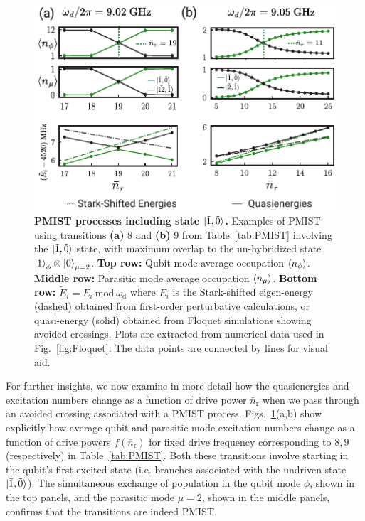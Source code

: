 \documentclass[%
reprint,
superscriptaddress,
 amsmath,amssymb,
 aps,
 prx,
longbibliography,
floatfix,
]{revtex4-2}
\begin{document}
 \begin{figure}[t]
    \centering
    \includegraphics[width=\linewidth]{Figures/Floquet_011.pdf}
    \caption{{\bf PMIST processes including state $\ket{\tilde{1},\tilde{0}}$.} Examples of PMIST using transitions \textbf{(a)} $8$ and \textbf{(b)} $9$ from Table~\ref{tab:PMIST} involving the $\ket{\tilde{1},\tilde{0}}$ state, with maximum overlap to the un-hybridized state $\ket{1}_\phi\otimes\ket{0}_{\mu=2}$. \textbf{Top row:} Qubit mode average occupation $\braket{n_\phi}$. \textbf{Middle row:} Parasitic mode average occupation $\braket{n_\mu}$. \textbf{Bottom row:} $\tilde{E}_i=E_i \ \textrm{mod} \ \omega_\textrm{d}$ where $E_i$ is the Stark-shifted eigen-energy (dashed) obtained from first-order perturbative calculations, or quasi-energy (solid) obtained from Floquet simulations showing avoided crossings. Plots are extracted from numerical data used in Fig.~\ref{fig:Floquet}. The data points are connected by lines for visual aid.}
    \label{fig:011}
\end{figure}

For further insights, we now examine in more detail how the quasienergies and excitation numbers change as a function of drive power $\bar{n}_\textrm{r}$ when we pass through an avoided crossing associated with a PMIST process. Figs.~\ref{fig:011}(a,b) show explicitly how average qubit and parasitic mode excitation numbers change as a function of drive powers $f(\bar n_\textrm{r})$ for fixed drive frequency corresponding to $8,9$ (respectively) in Table~\ref{tab:PMIST}.  Both these transitions involve starting in the qubit's first excited state (i.e. branches associated with the undriven state $\ket{\tilde{1},\tilde{0}}$). The simultaneous exchange of population in the qubit mode $\phi$, shown in the top panels, and the parasitic mode $\mu=2$, shown in the middle panels, confirms that the transitions are indeed PMIST. 
\end{document}

